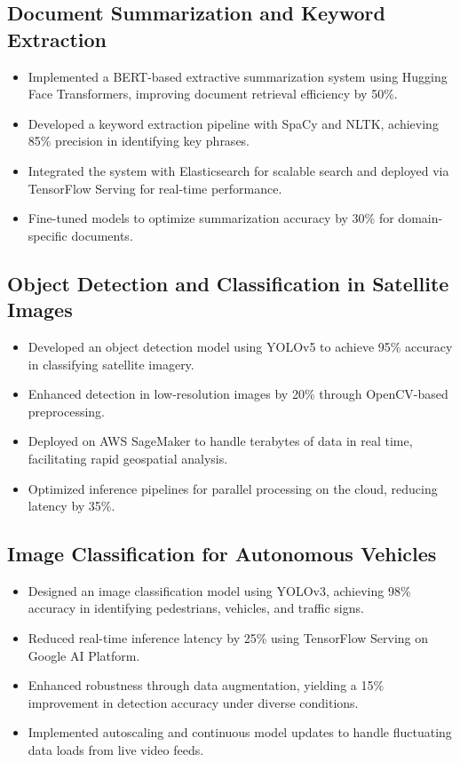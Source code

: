 \documentclass[12pt,a4paper]{article}
\begin{document}
\subsection*{Document Summarization and Keyword Extraction}
\begin{itemize}[leftmargin=*,noitemsep,topsep=0pt]
  \item Implemented a BERT-based extractive summarization system using Hugging Face Transformers, improving document retrieval efficiency by 50\%.
  \item Developed a keyword extraction pipeline with SpaCy and NLTK, achieving 85\% precision in identifying key phrases.
  \item Integrated the system with Elasticsearch for scalable search and deployed via TensorFlow Serving for real-time performance.
  \item Fine-tuned models to optimize summarization accuracy by 30\% for domain-specific documents.
\end{itemize}

\subsection*{Object Detection and Classification in Satellite Images}
\begin{itemize}[leftmargin=*,noitemsep,topsep=0pt]
  \item Developed an object detection model using YOLOv5 to achieve 95\% accuracy in classifying satellite imagery.
  \item Enhanced detection in low-resolution images by 20\% through OpenCV-based preprocessing.
  \item Deployed on AWS SageMaker to handle terabytes of data in real time, facilitating rapid geospatial analysis.
  \item Optimized inference pipelines for parallel processing on the cloud, reducing latency by 35\%.
\end{itemize}

\subsection*{Image Classification for Autonomous Vehicles}
\begin{itemize}[leftmargin=*,noitemsep,topsep=0pt]
  \item Designed an image classification model using YOLOv3, achieving 98\% accuracy in identifying pedestrians, vehicles, and traffic signs.
  \item Reduced real-time inference latency by 25\% using TensorFlow Serving on Google AI Platform.
  \item Enhanced robustness through data augmentation, yielding a 15\% improvement in detection accuracy under diverse conditions.
  \item Implemented autoscaling and continuous model updates to handle fluctuating data loads from live video feeds.
\end{itemize}
\end{document}
